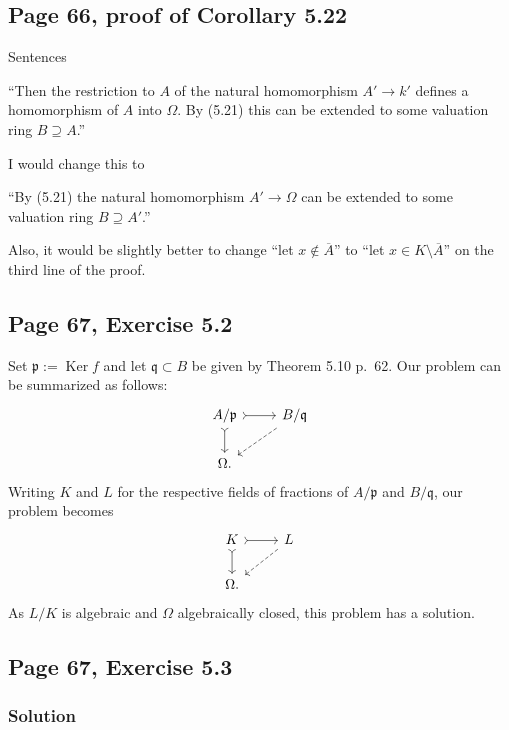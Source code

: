 \documentclass[parskip=half,fontsize=12pt]{scrartcl}%
\newcommand{\oo}{\operatorname}\newcommand{\ooo}{\operatorname*}
\newcommand{\mf}{\mathfrak}
\newcommand{\ppp}{\mf p}
\newcommand{\qqq}{\mf q}
\begin{document}
\subsection{Page 66, proof of Corollary 5.22}%

Sentences

``Then the restriction to $A$ of the natural homomorphism $A'\to k'$ defines a homomorphism of $A$ into $\Omega$. By (5.21) this can be extended to some valuation ring $B\supseteq A$.''

I would change this to 

``By (5.21) the natural homomorphism $A'\to\Omega$ can be extended to some valuation ring $B\supseteq A'$.'' %

Also, it would be slightly better to change ``let $x\notin\overline A$'' to ``let $x\in K\setminus\overline A$'' on the third line of the proof.%

\subsection{Page 67, Exercise 5.2}\label{67}%

Set $\ppp:=\oo{Ker}f$ and let $\qqq\subset B$ be given by Theorem 5.10 p.~62. Our problem can be summarized as follows: 
$$
\begin{tikzcd}
A/\ppp\ar[r,tail]\ar[d,tail]&B/\qqq\ar[dl,dashrightarrow]\\ 
\Omega.
\end{tikzcd}
$$ 
Writing $K$ and $L$ for the respective fields of fractions of $A/\ppp$ and $B/\qqq$, our problem becomes  
$$
\begin{tikzcd}
K\ar[r,tail]\ar[d,tail]&L\ar[dl,dashrightarrow]\\ 
\Omega.
\end{tikzcd}
$$ 
As $L/K$ is algebraic and $\Omega$ algebraically closed, this problem has a solution.

\subsection{Page 67, Exercise 5.3}%

\subsubsection{Solution}
\end{document}
